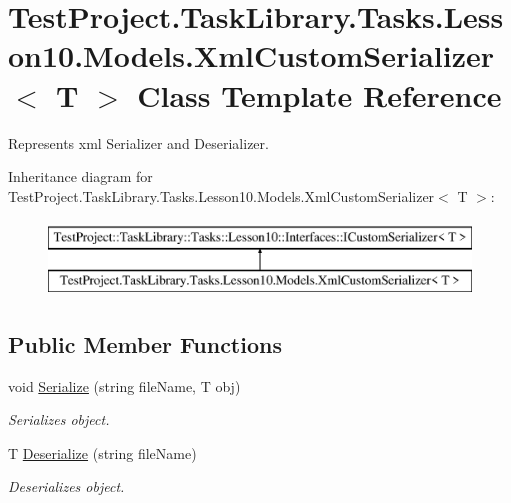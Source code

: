 \hypertarget{class_test_project_1_1_task_library_1_1_tasks_1_1_lesson10_1_1_models_1_1_xml_custom_serializer}{}\section{Test\+Project.\+Task\+Library.\+Tasks.\+Lesson10.\+Models.\+Xml\+Custom\+Serializer$<$ T $>$ Class Template Reference}
\label{class_test_project_1_1_task_library_1_1_tasks_1_1_lesson10_1_1_models_1_1_xml_custom_serializer}


Represents xml Serializer and Deserializer.  


Inheritance diagram for Test\+Project.\+Task\+Library.\+Tasks.\+Lesson10.\+Models.\+Xml\+Custom\+Serializer$<$ T $>$\+:\begin{figure}[H]
\begin{center}
\leavevmode
\includegraphics[height=2.000000cm]{class_test_project_1_1_task_library_1_1_tasks_1_1_lesson10_1_1_models_1_1_xml_custom_serializer}
\end{center}
\end{figure}
\subsection*{Public Member Functions}
\begin{DoxyCompactItemize}
\item 
void \mbox{\hyperlink{class_test_project_1_1_task_library_1_1_tasks_1_1_lesson10_1_1_models_1_1_xml_custom_serializer_a43bef2f5e925fde5f8f405dd59afafa7}{Serialize}} (string file\+Name, T obj)
\begin{DoxyCompactList}\small\item\em Serializes object. \end{DoxyCompactList}\item 
T \mbox{\hyperlink{class_test_project_1_1_task_library_1_1_tasks_1_1_lesson10_1_1_models_1_1_xml_custom_serializer_ab58e90ad5d153889408f12948a3438b6}{Deserialize}} (string file\+Name)
\begin{DoxyCompactList}\small\item\em Deserializes object. \end{DoxyCompactList}\end{DoxyCompactItemize}


